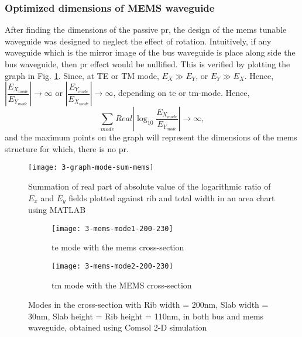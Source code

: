 \documentclass[../report.tex]{subfiles}
\begin{document}
\subsubsection{Optimized dimensions of MEMS waveguide}
After finding the dimensions of the passive \gls{pr}, the design of the \gls{mems} tunable waveguide was designed to neglect the effect of rotation. Intuitively, if any waveguide which is the mirror image of the bus waveguide is place along side the bus waveguide, then \gls{pr} effect would be nullified. This is verified by plotting the graph in Fig. \ref{fig:3_graph_mode_sum_mems}. Since, at TE or TM mode, $E_X \gg E_Y$, or $E_Y \gg E_X$. Hence, $\left|\dfrac {E_{X_{mode}}} {E_{Y_{mode}}}\right| \rightarrow \infty$ or $\left|\dfrac {E_{Y_{mode}}} {E_{X_{mode}}}\right| \rightarrow \infty$, depending on \gls{te} or \gls{tm}-mode.
Hence, 
\begin{equation}\label{eq:mems_dim_eq}
\sum _{mode}Real\left| \log _{10}\dfrac {E_{X_{mode}}} {E_{Y_{mode}}}\right| \rightarrow \infty,
\end{equation}
and the maximum points on the graph will represent the dimensions of the \gls{mems} structure for which, there is no \gls{pr}.

\begin{figure}[H] %
	\centering
	\texttt{[image: 3-graph-mode-sum-mems]}
	\caption{Summation of real part of absolute value of the logarithmic ratio of $E_x$ and $E_y$ fields plotted against rib and total width in an area chart using MATLAB}
	\label{fig:3_graph_mode_sum_mems}
\end{figure}
		
\begin{figure}[H] %
	\begin{subfigure}[t]{0.45\textwidth}
		\texttt{[image: 3-mems-mode1-200-230]}
		\caption{\gls{te} mode with the \gls{mems} cross-section}
		\label{fig:3_mems_mode1_200_230}
	\end{subfigure}
	\hfill
	\begin{subfigure}[t]{0.45\textwidth}
		\texttt{[image: 3-mems-mode2-200-230]}
		\caption{\gls{tm} mode with the MEMS cross-section}
		\label{fig:3-mems-mode2-200-230}
	\end{subfigure}
	\caption{Modes in the cross-section with Rib width = 200nm, Slab width = 30nm, Slab height = Rib height = 110nm, in both bus and \gls{mems} waveguide, obtained using Comsol 2-D simulation}
\end{figure}
\end{document}
